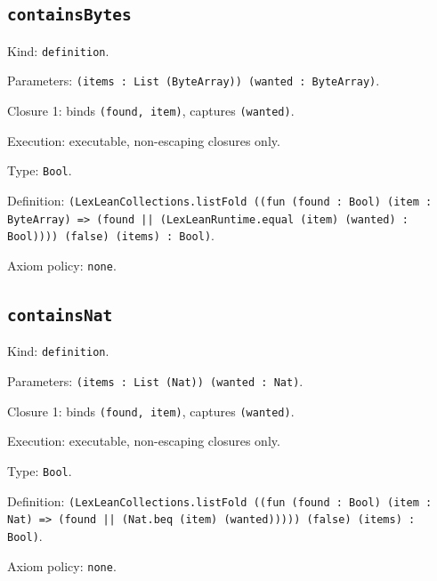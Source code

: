 \documentclass[11pt]{article}
\begin{document}
\subsection*{\texttt{containsBytes}}
\noindent Kind: \texttt{definition}.\par
\noindent Parameters: \texttt{(items : List (ByteArray)) (wanted : ByteArray)}.\par
\noindent Closure 1: binds \texttt{(found, item)}, captures \texttt{(wanted)}.\par
\noindent Execution: executable, non-escaping closures only.\par
\noindent Type: \texttt{Bool}.\par
\noindent Definition: \texttt{(LexLeanCollections.listFold ((fun (found : Bool) (item : ByteArray) => (found || (LexLeanRuntime.equal (item) (wanted) : Bool)))) (false) (items) : Bool)}.\par
\noindent Axiom policy: \texttt{none}.\par
\subsection*{\texttt{containsNat}}
\noindent Kind: \texttt{definition}.\par
\noindent Parameters: \texttt{(items : List (Nat)) (wanted : Nat)}.\par
\noindent Closure 1: binds \texttt{(found, item)}, captures \texttt{(wanted)}.\par
\noindent Execution: executable, non-escaping closures only.\par
\noindent Type: \texttt{Bool}.\par
\noindent Definition: \texttt{(LexLeanCollections.listFold ((fun (found : Bool) (item : Nat) => (found || (Nat.beq (item) (wanted))))) (false) (items) : Bool)}.\par
\noindent Axiom policy: \texttt{none}.\par
\end{document}
